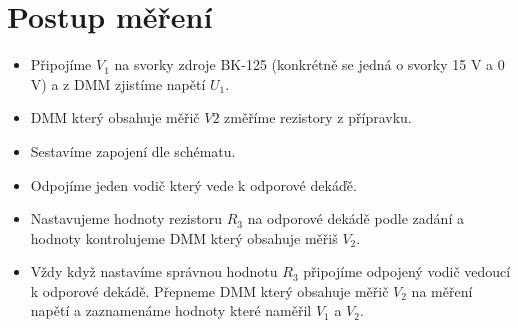 \section{Postup měření}
  \begin{itemize}
    \item
      Připojíme $V_1$ na svorky zdroje BK-125 (konkrétně se jedná o svorky 15 V a 0 V) a z DMM zjistíme napětí $U_1$.
    \item
      DMM který obsahuje měřič $V2$ změříme rezistory z přípravku.
    \item
      Sestavíme zapojení dle schématu.
    \item
      Odpojíme jeden vodič který vede k odporové dekáďě.
    \item
      Nastavujeme hodnoty rezistoru $R_3$ na odporové dekádě podle zadání a hodnoty kontrolujeme DMM který obsahuje měřiš $V_2$.
    \item
      Vždy když nastavíme správnou hodnotu $R_3$ připojíme odpojený vodič vedoucí k odporové dekádě. Přepneme DMM který obsahuje měřič $V_2$ na měření napětí a zaznamenáme hodnoty které naměřil $V_1$ a $V_2$.
  \end{itemize}
